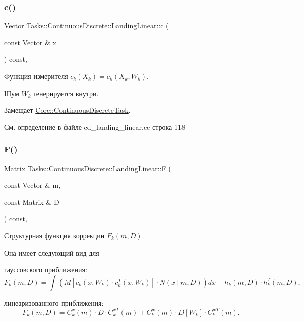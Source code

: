 \subsubsection{\texorpdfstring{c()}{c()}}
{\footnotesize\ttfamily Vector Tasks\+::\+Continuous\+Discrete\+::\+Landing\+Linear\+::c (\begin{DoxyParamCaption}\item[{const Vector \&}]{x }\end{DoxyParamCaption}) const\hspace{0.3cm}{\ttfamily [override]}, {\ttfamily [virtual]}}



Функция измерителя $c_k(X_k) = c_k(X_k, W_k)$. 

Шум $W_k$ генерируется внутри. 

Замещает \hyperlink{class_core_1_1_continuous_discrete_task_a64ea27bc1e2a9e6bf1401fc7622c9aea}{Core\+::\+Continuous\+Discrete\+Task}.



См. определение в файле cd\+\_\+landing\+\_\+linear.\+cc строка 118

\hypertarget{class_tasks_1_1_continuous_discrete_1_1_landing_linear_a5b5a327866160bf687dbc6d82a801ce8}{}\label{class_tasks_1_1_continuous_discrete_1_1_landing_linear_a5b5a327866160bf687dbc6d82a801ce8} 
\subsubsection{\texorpdfstring{F()}{F()}}
{\footnotesize\ttfamily Matrix Tasks\+::\+Continuous\+Discrete\+::\+Landing\+Linear\+::F (\begin{DoxyParamCaption}\item[{const Vector \&}]{m,  }\item[{const Matrix \&}]{D }\end{DoxyParamCaption}) const\hspace{0.3cm}{\ttfamily [override]}, {\ttfamily [virtual]}}



Структурная функция коррекции $F_k(m, D)$. 

Она имеет следующий вид для


\begin{DoxyItemize}
\item гауссовского приближения\+: \[F_k(m, D) = \int (M[c_k(x,W_k)\cdot c_k^T(x, W_k)] \cdot N(x\ |\ m,D))dx - h_k(m,D)\cdot h_k^T(m,D),\]
\item линеаризованного приближения\+: \[F_k(m, D) = C_k^x(m)\cdot D\cdot C_k^{xT}(m) + C_k^w(m)\cdot D[W_k]\cdot C_k^{wT}(m).\]
\end{DoxyItemize}

